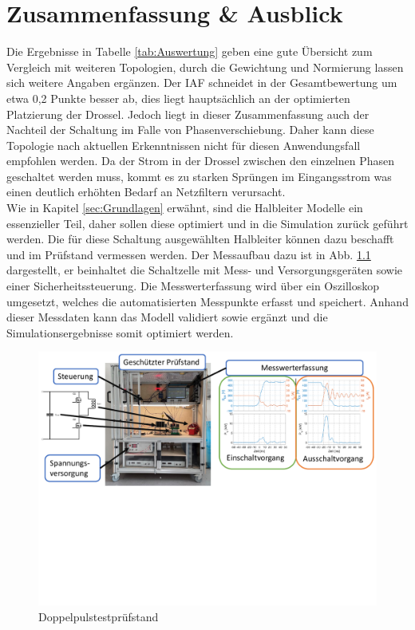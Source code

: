 \chapter{Zusammenfassung \& Ausblick}
Die Ergebnisse in Tabelle \ref{tab:Auswertung} geben eine gute Übersicht zum Vergleich mit weiteren Topologien, durch die Gewichtung und Normierung lassen sich weitere Angaben ergänzen. Der \gls{IAF} schneidet in der Gesamtbewertung um etwa 0,2 Punkte besser ab, dies liegt hauptsächlich an der optimierten Platzierung der Drossel. Jedoch liegt in dieser Zusammenfassung auch der Nachteil der Schaltung im Falle von Phasenverschiebung. Daher kann diese Topologie nach aktuellen Erkenntnissen nicht für diesen Anwendungsfall empfohlen werden. Da der Strom in der Drossel zwischen den einzelnen Phasen geschaltet werden muss, kommt es zu starken Sprüngen im Eingangsstrom was einen deutlich erhöhten Bedarf an Netzfiltern verursacht. \\ 


Wie in Kapitel \ref{sec:Grundlagen} erwähnt, sind die Halbleiter Modelle ein essenzieller Teil, daher sollen diese optimiert und in die Simulation zurück geführt werden. Die für diese Schaltung ausgewählten Halbleiter können dazu beschafft und im Prüfstand vermessen werden. Der Messaufbau dazu ist in Abb. \ref{fig:dpt} dargestellt, er beinhaltet die Schaltzelle mit Mess- und Versorgungsgeräten sowie einer Sicherheitssteuerung. Die Messwerterfassung wird über ein Oszilloskop umgesetzt, welches die automatisierten Messpunkte erfasst und speichert.  Anhand dieser Messdaten kann das Modell validiert sowie ergänzt und die Simulationsergebnisse somit optimiert werden. \\

 
\begin{figure}
	\centering
	\includegraphics[width=0.9\linewidth]{content/Grafiken/DPT}
	\caption[Doppelpulstestprüfstand]{Doppelpulstestprüfstand}
	\label{fig:dpt}
\end{figure}

